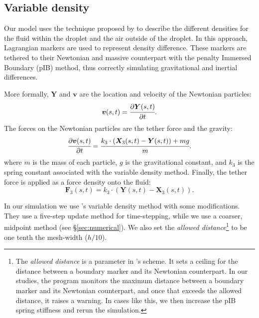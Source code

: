 \documentclass{jfm}
\begin{document}
\subsection{Variable density}
Our model uses the technique proposed by \cite{IBM_variable_density} to describe the different densities for the fluid within the droplet and the air outside of the droplet. In this approach, Lagrangian markers are used to represent density difference. These markers are tethered to their Newtonian and massive counterpart with the penalty Immersed Boundary (pIB) method, thus correctly simulating gravitational and inertial differences.

More formally, $\boldsymbol{Y}$ and $\boldsymbol{v}$ are the location and velocity of the Newtonian particles: 
\begin{equation}
\bm{v}(s,t) = \cfrac{\partial \bm{Y}(s,t)}{\partial t}.
\end{equation}
The forces on the Newtonian particles are the tether force and the gravity: 
\begin{equation}
\cfrac{\partial \bm{v}(s,t)}{\partial t} = \cfrac
    {k_3 \cdot (
        \bm{X}_3(s,t) - \bm{Y}(s,t)
    ) + m g}
    {m}.
\end{equation}
where $m$ is the mass of each particle, $g$ is the gravitational constant, and $k_3$ is the spring constant associated with the variable density method. Finally, the tether force is applied as a force density onto the fluid:
\begin{equation}
\bm{F}_3(s,t) = k_3 \cdot (
    \bm{Y}(s,t) - \bm{X}_3(s,t)
). 
\end{equation}

In our simulation we use \cite{IBM_variable_density}'s variable density method with some modifications. They use a five-step update method for time-stepping, while we use a coarser, midpoint method (see \S\ref{sec:numerical}). We also set the \textit{allowed distance}\footnote{The \textit{allowed distance} is a parameter in \cite{IBM_variable_density}'s scheme. It sets a ceiling for the distance between a boundary marker and its Newtonian counterpart. In our studies, the program monitors the maximum distance between a boundary marker and its Newtonian counterpart, and once that exceeds the allowed distance, it raises a warning. In cases like this, we then increase the pIB spring stiffness and rerun the simulation.} to be one tenth the mesh-width ($h/10$). 
\end{document}
